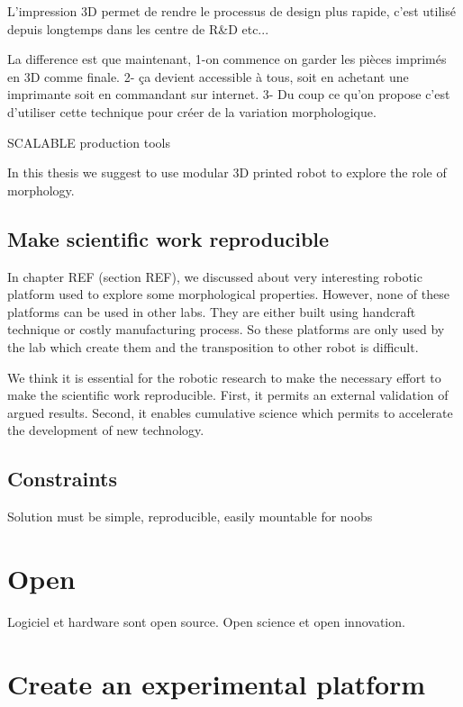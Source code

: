 L'impression 3D permet de rendre le processus de design plus rapide, c'est utilisé depuis longtemps dans les centre de R\&D etc...

La difference est que maintenant, 1-on commence on garder les pièces imprimés en 3D comme finale. 2- ça devient accessible à tous, soit en achetant une imprimante soit en commandant sur internet. 3- Du coup ce qu'on propose c'est d'utiliser cette technique pour créer de la variation morphologique.


SCALABLE production tools

In this thesis we suggest to use modular 3D printed robot to explore the role of morphology.


\subsection{Make scientific work reproducible} %

In chapter REF (section REF), we discussed about very interesting robotic platform used to explore some morphological properties. However, none of these platforms can be used in other labs. They are either built using handcraft technique or costly manufacturing process. So these platforms are only used by the lab which create them and the transposition to other robot is difficult.

We think it is essential for the robotic research to make the necessary effort to make the scientific work reproducible. First, it permits an external validation of argued results. Second, it enables cumulative science which permits to accelerate the development of new technology.

\subsection{Constraints} %

Solution must be simple, reproducible, easily mountable for noobs

\section{Open} %

Logiciel et hardware sont open source. Open science et open innovation.




\section{Create an experimental platform} %

